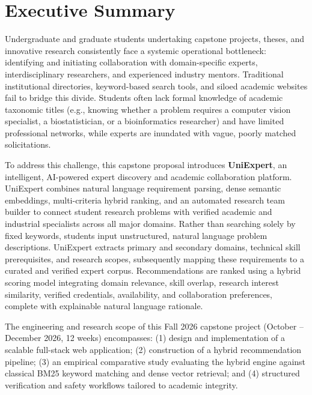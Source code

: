 \documentclass[11pt,a4paper]{article}
\begin{document}
\thispagestyle{plain}
\section*{Executive Summary}

Undergraduate and graduate students undertaking capstone projects, theses, and innovative research consistently face a systemic operational bottleneck: identifying and initiating collaboration with domain-specific experts, interdisciplinary researchers, and experienced industry mentors. Traditional institutional directories, keyword-based search tools, and siloed academic websites fail to bridge this divide. Students often lack formal knowledge of academic taxonomic titles (e.g., knowing whether a problem requires a computer vision specialist, a biostatistician, or a bioinformatics researcher) and have limited professional networks, while experts are inundated with vague, poorly matched solicitations.

To address this challenge, this capstone proposal introduces \textbf{UniExpert}, an intelligent, AI-powered expert discovery and academic collaboration platform. UniExpert combines natural language requirement parsing, dense semantic embeddings, multi-criteria hybrid ranking, and an automated research team builder to connect student research problems with verified academic and industrial specialists across all major domains. Rather than searching solely by fixed keywords, students input unstructured, natural language problem descriptions. UniExpert extracts primary and secondary domains, technical skill prerequisites, and research scopes, subsequently mapping these requirements to a curated and verified expert corpus. Recommendations are ranked using a hybrid scoring model integrating domain relevance, skill overlap, research interest similarity, verified credentials, availability, and collaboration preferences, complete with explainable natural language rationale.

The engineering and research scope of this Fall 2026 capstone project (October -- December 2026, 12 weeks) encompasses: (1) design and implementation of a scalable full-stack web application; (2) construction of a hybrid recommendation pipeline; (3) an empirical comparative study evaluating the hybrid engine against classical BM25 keyword matching and dense vector retrieval; and (4) structured verification and safety workflows tailored to academic integrity.
\end{document}
